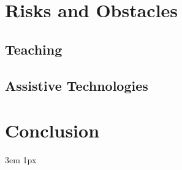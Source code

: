 \documentclass{Academic}
\begin{document}
    \section{Risks and Obstacles}

    \subsection{Teaching}

    \subsection{Assistive Technologies}

    \section{Conclusion}

    \singlespacing
    \emergencystretch 3em
    \hfuzz 1px
    \printbibliography[heading=bibnumbered]




\end{document}
